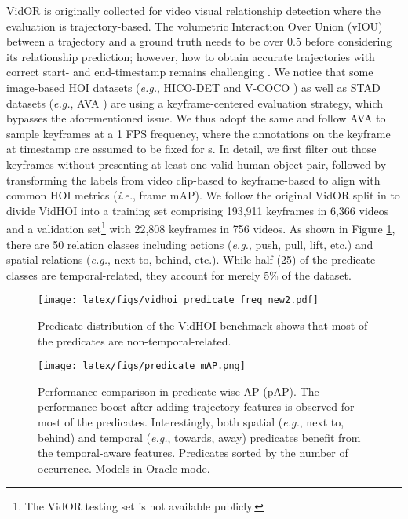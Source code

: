 \documentclass[sigconf]{acmart}
\begin{document}
VidOR is originally collected for video visual relationship detection where the evaluation is trajectory-based. The volumetric Interaction Over Union (vIOU) between a trajectory and a ground truth needs to be over 0.5 before considering its relationship prediction; however, how to obtain accurate trajectories with correct start- and end-timestamp remains challenging \cite{sun2019video,shang2017video}.
We notice that some image-based HOI datasets (\emph{e.g.}, HICO-DET \cite{chao2018learning} and V-COCO \cite{gupta2015visual}) as well as STAD datasets (\emph{e.g.}, AVA \cite{gu2018ava}) are using a keyframe-centered evaluation strategy, which bypasses the aforementioned issue.
We thus adopt the same and follow AVA to sample keyframes at a 1 FPS frequency, where the annotations on the keyframe at timestamp  are assumed to be fixed for s. 
In detail, we first filter out those keyframes without presenting at least one valid human-object pair, followed by transforming the labels from video clip-based to keyframe-based to align with common HOI metrics (\emph{i.e.}, frame mAP).
We follow the original VidOR split in \cite{shang2019annotating} to divide VidHOI into a training set comprising 193,911 keyframes in 6,366 videos and a validation set\footnote{The VidOR testing set is not available publicly.} with 22,808 keyframes in 756 videos. 
As shown in Figure \ref{fig:pred_dist}, there are 50 relation classes including actions (\emph{e.g.}, {\selectfont push}, {\selectfont pull}, {\selectfont lift}, etc.) and spatial relations (\emph{e.g.}, {\selectfont next to}, {\selectfont behind}, etc.).
While half (25) of the predicate classes are temporal-related, they account for merely 5\% of the dataset.


\begin{figure}[t]
\begin{center}
\texttt{[image: latex/figs/vidhoi\_predicate\_freq\_new2.pdf]}
\end{center}
\vspace{-1.3em}
   \caption{Predicate distribution of the VidHOI benchmark shows that most of the predicates are non-temporal-related.}
\label{fig:pred_dist}
\vspace{-1.5em}
\end{figure}

\begin{figure*}[ht!]
\centering
\texttt{[image: latex/figs/predicate\_mAP.png]}
\vspace{-1.5em}
\caption{Performance comparison in predicate-wise AP (pAP).
The performance boost after adding trajectory features is observed for most of the predicates.
Interestingly, both spatial (\emph{e.g.}, {\selectfont next to}, {\selectfont behind}) and temporal (\emph{e.g.}, {\selectfont towards}, {\selectfont away}) predicates benefit from the temporal-aware features.
Predicates sorted by the number of occurrence.
Models in {\selectfont Oracle} mode.
}
\vspace{-1em}
\label{fig:predicate_map}
\end{figure*}
\end{document}

